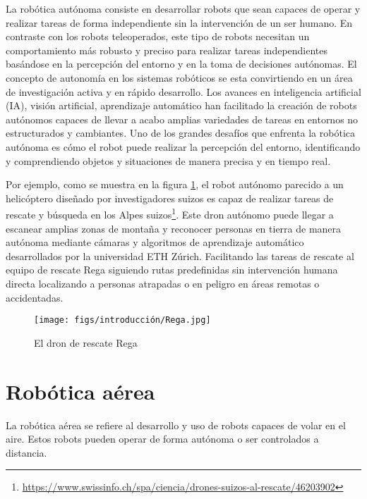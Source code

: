 La robótica autónoma consiste en desarrollar robots que sean capaces de operar y realizar tareas de forma independiente sin la intervención de un ser humano. En contraste con los 
robots teleoperados, este tipo de robots necesitan un comportamiento más robusto y preciso para realizar tareas independientes basándose en la percepción del entorno 
y en la toma de decisiones autónomas.
El concepto de autonomía en los sistemas robóticos se esta convirtiendo en un área de investigación activa y en rápido desarrollo. Los avances en inteligencia artificial (IA), visión 
artificial, aprendizaje automático han facilitado la creación de robots autónomos capaces de llevar a acabo amplias variedades de tareas en entornos no estructurados y cambiantes. 
Uno de los grandes desafíos que enfrenta la robótica autónoma es cómo el robot puede realizar la percepción del entorno, identificando y comprendiendo objetos y situaciones de manera
precisa y en tiempo real. 

Por ejemplo, como se muestra en la figura \ref{fig:Rega}, el robot autónomo parecido a un helicóptero diseñado por investigadores suizos es capaz de realizar tareas de 
rescate y búsqueda en los Alpes suizos\footnote{\url{https://www.swissinfo.ch/spa/ciencia/drones-suizos-al-rescate/46203902}}. Este dron autónomo puede llegar a escanear amplias zonas de montaña y reconocer personas en tierra de manera autónoma mediante
cámaras y algoritmos de aprendizaje automático desarrollados por la universidad ETH Zúrich. Facilitando las tareas de rescate al equipo de rescate Rega siguiendo rutas
predefinidas sin intervención humana directa localizando a personas atrapadas o en peligro en áreas remotas o accidentadas.

\begin{figure} [H]
  \begin{center}
    \texttt{[image: figs/introducción/Rega.jpg]}
  \end{center}
  \caption{El dron de rescate Rega}
  \label{fig:Rega}
  \vspace{-1.5em}
\end{figure}

\section{Robótica aérea}
\label{sec:subseccion}
La robótica aérea se refiere al desarrollo y uso de robots capaces de volar en el aire. Estos robots pueden operar de forma autónoma o ser controlados a distancia.

